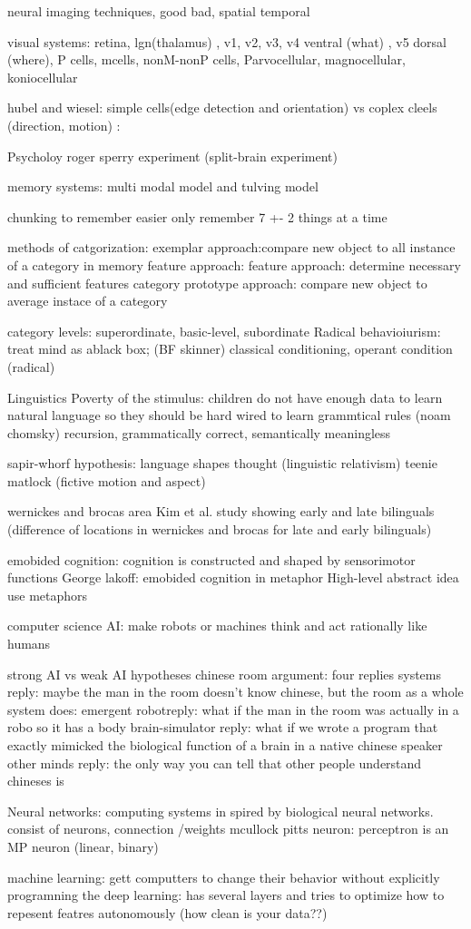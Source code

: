 \documentclass{article}
\begin{document}
neural imaging techniques, good bad, spatial temporal

visual systems: retina, lgn(thalamus) , v1, v2, v3, v4 ventral (what) , v5 dorsal (where), 
P cells, mcells, nonM-nonP cells, 
Parvocellular, magnocellular, koniocellular

hubel and wiesel: simple cells(edge detection and orientation) vs coplex cleels (direction, motion) :

Psycholoy 
roger sperry experiment (split-brain experiment) 

memory systems: multi modal model and tulving model 

chunking to remember easier
only remember 7 +- 2 things at a time

methods of catgorization:
exemplar approach:compare new object to all instance of a category in memory
feature approach: feature approach: determine necessary and sufficient features category
prototype approach: compare new object to average instace of a category

category levels: superordinate, basic-level, subordinate
Radical behavioiurism: treat mind as  ablack box; (BF skinner) 
classical conditioning, operant condition (radical) 

Linguistics
 Poverty of the stimulus: children do not have enough data to learn natural language so they should be hard wired to learn grammtical rules (noam chomsky) recursion, grammatically correct, semantically meaningless
 
 sapir-whorf hypothesis: language shapes thought (linguistic relativism) 
teenie matlock (fictive motion and aspect) 

wernickes and brocas area
Kim et al. study showing early and late bilinguals (difference of locations in wernickes and brocas for late and early bilinguals) 

emobided cognition: cognition is constructed and shaped by sensorimotor functions
George lakoff: emobided cognition in metaphor
High-level abstract idea use metaphors 

computer science 
AI: make robots or machines think and act rationally like humans

strong AI vs weak AI hypotheses
chinese room argument: four replies
systems reply: maybe the man in the room doesn't know chinese, but the room as a whole system does: emergent
robotreply: what if the man in the room was actually in a robo so it has a body
brain-simulator reply: what if we wrote a program that exactly mimicked the biological function of a brain in a native chinese speaker
other minds reply: the only way you can tell that other people understand chineses is 

Neural networks: computing systems in spired by biological neural networks. consist of neurons, connection /weights
mcullock pitts neuron: 
perceptron is an MP neuron (linear, binary) 

machine learning: gett computters to change their behavior without explicitly programning the
deep learning: has several layers and tries to optimize how to repesent featres autonomously
(how clean is your data??) 
\end{document}
